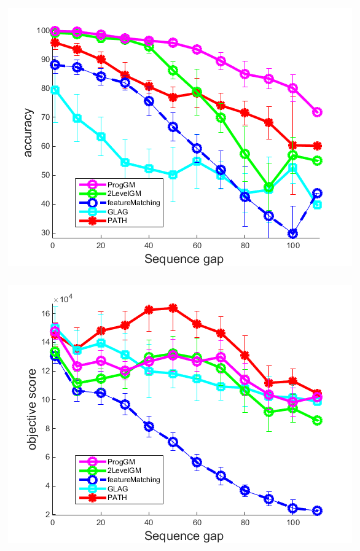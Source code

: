 \documentclass[hyperref={pdfpagelabels=false}]{beamer}
\begin{document}
\begin{frame}[allowframebreaks]
\begin{minipage}[0.2\textheight]{\textwidth}
\begin{columns}[T]
\begin{column}{0.7\textwidth}
			\begin{figure}[h] \centering
					\begin{subfigure}[b]{0.32\textwidth}
						\centering
						\includegraphics[scale=0.12]{"fig/evaluation/HouseSeq2/anchor_descr/using_cpd_afftrafo/ext_solution2/performance/accuracy"} 
					\end{subfigure} 
					\begin{subfigure}[b]{0.32\textwidth}
						\centering
						\includegraphics[scale=0.12]{"fig/evaluation/HouseSeq2/anchor_descr/using_cpd_afftrafo/ext_solution2/performance/score"} 
					\end{subfigure}
					\begin{subfigure}[b]{0.32\textwidth}
						\centering

\end{subfigure}
\end{figure}
\end{column}
\end{columns}
\end{minipage}
\end{frame}
\end{document}
